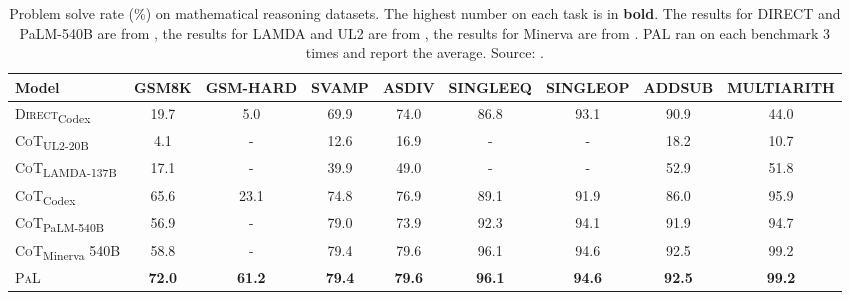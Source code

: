 \begin{table}[ht]
	\centering
	\begin{tabularx}{\textwidth}{Xcccccccc}
		\hline
		\textbf{Model}                           & \textbf{GSM8K} & \textbf{GSM-HARD} & \textbf{SVAMP} & \textbf{ASDIV} & \textbf{SINGLEEQ} & \textbf{SINGLEOP} & \textbf{ADDSUB} & \textbf{MULTIARITH} \\ \hline
		\textsc{Direct}\textsubscript{Codex}     & 19.7           & 5.0               & 69.9           & 74.0           & 86.8              & 93.1              & 90.9            & 44.0                \\
		\textsc{CoT}\textsubscript{UL2-20B}      & 4.1            & -                 & 12.6           & 16.9           & -                 & -                 & 18.2            & 10.7                \\
		\textsc{CoT}\textsubscript{LAMDA-137B}   & 17.1           & -                 & 39.9           & 49.0           & -                 & -                 & 52.9            & 51.8                \\
		\textsc{CoT}\textsubscript{Codex}        & 65.6           & 23.1              & 74.8           & 76.9           & 89.1              & 91.9              & 86.0            & 95.9                \\
		\textsc{CoT}\textsubscript{PaLM-540B}    & 56.9           & -                 & 79.0           & 73.9           & 92.3              & 94.1              & 91.9            & 94.7                \\
		\textsc{CoT}\textsubscript{Minerva} 540B & 58.8           & -                 & 79.4           & 79.6           & 96.1              & 94.6              & 92.5            & 99.2                \\
		\textsc{PaL}                             & \textbf{72.0}  & \textbf{61.2}     & \textbf{79.4}  & \textbf{79.6}  & \textbf{96.1}     & \textbf{94.6}     & \textbf{92.5}   & \textbf{99.2}       \\ \hline
	\end{tabularx}
	\caption{Problem solve rate (\%) on mathematical reasoning datasets. The highest number on each task is in \textbf{bold}. The results for DIRECT and PaLM-540B are from \textcite{wei2022chain}, the results for LAMDA and UL2 are from \textcite{wang2022self}, the results for Minerva are from \textcite{lewkowycz2022minerva}. PAL ran on each benchmark 3 times and report the average. Source: \textcite{gao2022pal}.}
	\label{tab:pal-math}
\end{table}

